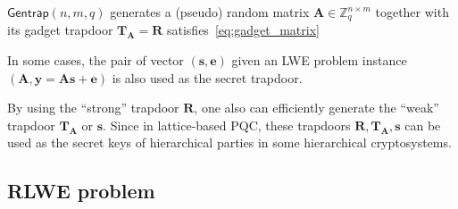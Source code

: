 \documentclass[cryptography,review,submit,pdftex,moreauthors,amsmath,amssymb,aps,strict]{Definitions/mdpi}
\let\oldalgorithmic\algorithmic
\let\endoldalgorithmic\endalgorithmic
\renewenvironment{algorithmic}
{\begin{adjustwidth}{-1em}{}\oldalgorithmic}
{\endoldalgorithmic\end{adjustwidth}}
\newcommand{\peter}[1]{\textcolor{red}{#1}}
\begin{document}
\begin{algorithm}[!htbp]
	\begin{algorithmic}
        \State{}
		\EndFunction
	\end{algorithmic}
	\caption{$\mathsf{Gentrap}(n,m,q)$ generates a (pseudo) random matrix $\mathbf{A}\in\mathbb{Z}^{n\times m}_q$ together with its gadget trapdoor $\mathbf{T}_\mathbf{A}=\mathbf{R}$ satisfies~\eqref{eq:gadget_matrix}} \label{alg:gentrap}
\end{algorithm}



In some cases, the pair of vector $(\mathbf{s},\mathbf{e})$ given an LWE problem instance $(\mathbf{A},\mathbf{y}=\mathbf{A}\mathbf{s}+\mathbf{e})$ is also used as the secret trapdoor.

By using the ``strong'' trapdoor $\mathbf{R}$, one also can efficiently generate the ``weak'' trapdoor $\mathbf{T}_{\mathbf{A}}$ or $\mathbf{s}$. Since in lattice-based PQC, these trapdoors $\mathbf{R},\mathbf{T}_{\mathbf{A}}, \mathbf{s}$ can be used as the secret keys of hierarchical parties in some hierarchical cryptosystems.


\subsection{RLWE problem}
\end{document}

